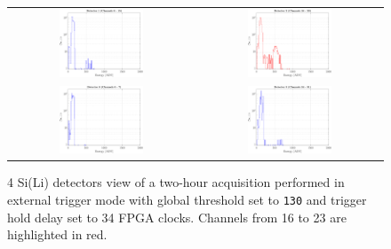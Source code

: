 \begin{figure}[h!]
    \centering
    \begin{tabular}{c c}
         \includegraphics[width=0.475\textwidth]{Images/chap3/results/muons/ch_ext_trigger_4plots/incoming_energy34_2hr_sens2.pdf} & \includegraphics[width=0.475\textwidth]{Images/chap3/results/muons/ch_ext_trigger_4plots/incoming_energy34_2hr_sens3.pdf} \\
         \includegraphics[width=0.475\textwidth]{Images/chap3/results/muons/ch_ext_trigger_4plots/incoming_energy34_2hr_sens1.pdf} & \includegraphics[width=0.475\textwidth]{Images/chap3/results/muons/ch_ext_trigger_4plots/incoming_energy34_2hr_sens4.pdf}
    \end{tabular}
    \caption{4 Si(Li) detectors view of a two-hour acquisition performed in external trigger mode with global threshold set to \texttt{130} and trigger hold delay set to 34 FPGA clocks. Channels from 16 to 23 are highlighted in red.}
    \label{figMUON4sensors}
\end{figure}


